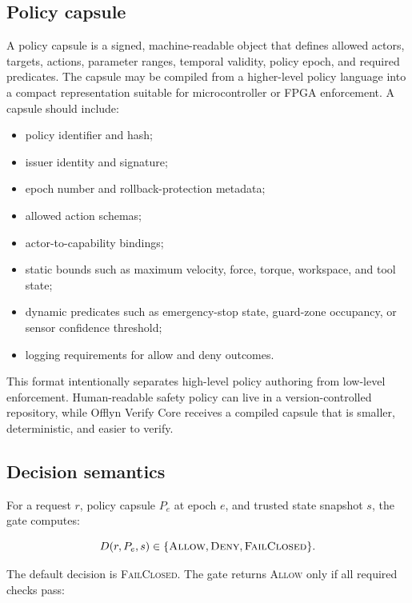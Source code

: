 \documentclass[10pt]{article}
\newcommand{\ovc}{Offlyn Verify Core\xspace}
\begin{document}
\subsection{Policy capsule}

A policy capsule is a signed, machine-readable object that defines allowed actors, targets, actions, parameter ranges, temporal validity, policy epoch, and required predicates. The capsule may be compiled from a higher-level policy language into a compact representation suitable for microcontroller or FPGA enforcement. A capsule should include:

\begin{itemize}[leftmargin=*]
  \item policy identifier and hash;
  \item issuer identity and signature;
  \item epoch number and rollback-protection metadata;
  \item allowed action schemas;
  \item actor-to-capability bindings;
  \item static bounds such as maximum velocity, force, torque, workspace, and tool state;
  \item dynamic predicates such as emergency-stop state, guard-zone occupancy, or sensor confidence threshold;
  \item logging requirements for allow and deny outcomes.
\end{itemize}

This format intentionally separates high-level policy authoring from low-level enforcement. Human-readable safety policy can live in a version-controlled repository, while \ovc receives a compiled capsule that is smaller, deterministic, and easier to verify.

\subsection{Decision semantics}

For a request $r$, policy capsule $P_e$ at epoch $e$, and trusted state snapshot $s$, the gate computes:

\[
D(r, P_e, s) \in \{\textsc{Allow}, \textsc{Deny}, \textsc{FailClosed}\}.
\]

The default decision is \textsc{FailClosed}. The gate returns \textsc{Allow} only if all required checks pass:
\end{document}
